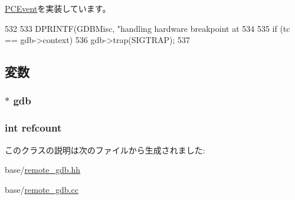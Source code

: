 \hyperlink{classPCEvent_af6ff225900b7b98c08880da7225b38f0}{PCEvent}を実装しています。


\begin{DoxyCode}
532 {
533     DPRINTF(GDBMisc, "handling hardware breakpoint at %
534 
535     if (tc == gdb->context)
536         gdb->trap(SIGTRAP);
537 }
\end{DoxyCode}


\subsection{変数}
\hypertarget{classBaseRemoteGDB_1_1HardBreakpoint_abc7630d7a55d0751927fed9b12d7b202}{
\subsubsection[{gdb}]{$\ast$ {\bf gdb}}}
\label{classBaseRemoteGDB_1_1HardBreakpoint_abc7630d7a55d0751927fed9b12d7b202}
\hypertarget{classBaseRemoteGDB_1_1HardBreakpoint_a6022c8a609170c7365fb96e83cb2df48}{
\subsubsection[{refcount}]{\setlength{\rightskip}{0pt plus 5cm}int {\bf refcount}}}
\label{classBaseRemoteGDB_1_1HardBreakpoint_a6022c8a609170c7365fb96e83cb2df48}


このクラスの説明は次のファイルから生成されました:\begin{DoxyCompactItemize}
\item 
base/\hyperlink{base_2remote__gdb_8hh}{remote\_\-gdb.hh}\item 
base/\hyperlink{base_2remote__gdb_8cc}{remote\_\-gdb.cc}\end{DoxyCompactItemize}
